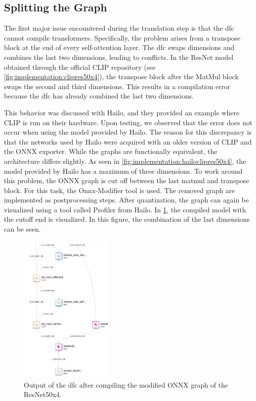 \subsection{Splitting the Graph}

The first major issue encountered during the translation step is that the \acrshort{dfc} cannot compile transformers.
Specifically, the problem arises from a transpose block at the end of every self-attention layer.
The \acrshort{dfc} swaps dimensions and combines the last two dimensions, leading to conflicts.
In the ResNet model obtained through the official CLIP repository (see \cref{fig:implementation:clipres50x4}), the transpose block after the MatMul block swaps the second and third dimensions.
This results in a compilation error because the \acrshort{dfc} has already combined the last two dimensions.

This behavior was discussed with Hailo, and they provided an example where CLIP is run on their hardware. Upon testing, we observed that the error does not occur when using the model provided by Hailo.
The reason for this discrepancy is that the networks used by Hailo were acquired with an older version of CLIP and the ONNX exporter.
While the graphs are functionally equivalent, the architecture differs slightly.
As seen in \cref{fig:implementation:hailoclipres50x4}, the model provided by Hailo has a maximum of three dimensions.
To work around this problem, the ONNX graph is cut off between the last matmul and transpose block.
For this task, the Onnx-Modifier tool \cite{onnxmodifier} is used.
The removed graph are implemented as postprocessing steps.
After quantization, the graph can again be visualized using a tool called Profiler from Hailo.
In \cref{fig:implementation:compareRN50x4qunathar}, the compiled model with the cutoff end is visualized.
In this figure, the combination of the last dimensions can be seen.

\begin{figure}
    \centering
    \includegraphics[width=0.4\textwidth]{Images/Implementation/ClipRes50x4_qunat_Har.png}
    \caption{Output of the \acrshort{dfc} after compiling the modified ONNX graph of the ResNet50x4.}
    \label{fig:implementation:compareRN50x4qunathar}
\end{figure}

